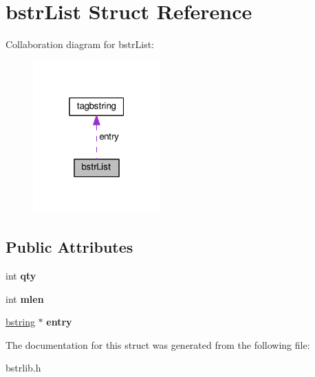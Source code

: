 \hypertarget{structbstrList}{}\section{bstr\+List Struct Reference}
\label{structbstrList}


Collaboration diagram for bstr\+List\+:\nopagebreak
\begin{figure}[H]
\begin{center}
\leavevmode
\includegraphics[width=139pt]{structbstrList__coll__graph}
\end{center}
\end{figure}
\subsection*{Public Attributes}
\begin{DoxyCompactItemize}
\item 
\hypertarget{structbstrList_a23465fcc1c43891c136fead866a30a0e}{}int {\bfseries qty}\label{structbstrList_a23465fcc1c43891c136fead866a30a0e}

\item 
\hypertarget{structbstrList_a27cec944f3421d6faaaaca651391eeb3}{}int {\bfseries mlen}\label{structbstrList_a27cec944f3421d6faaaaca651391eeb3}

\item 
\hypertarget{structbstrList_adab677d642e53205ebee8fd432977afc}{}\hyperlink{structtagbstring}{bstring} $\ast$ {\bfseries entry}\label{structbstrList_adab677d642e53205ebee8fd432977afc}

\end{DoxyCompactItemize}


The documentation for this struct was generated from the following file\+:\begin{DoxyCompactItemize}
\item 
bstrlib.\+h\end{DoxyCompactItemize}
